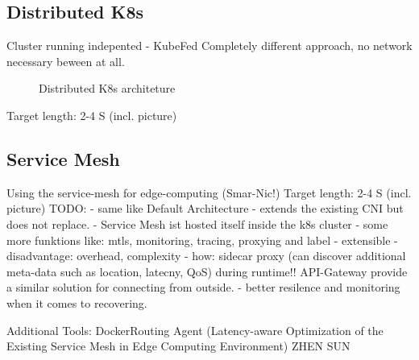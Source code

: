\documentclass[MSC,Master,english]{twbook}%
\begin{document}
\subsection{Distributed K8s}
Cluster running indepented - KubeFed
Completely different approach, no network necessary beween at all.
\begin{figure}[h]
    \centering
    \caption{Distributed \ac{K8s} architeture}
    \label{fig:default-k8s}
\end{figure}
Target length: 2-4 S (incl. picture)


\subsection{Service Mesh}
Using the service-mesh for edge-computing (Smar-Nic!)
Target length: 2-4 S (incl. picture)
TODO:
- same like Default Architecture
- extends the existing \ac{CNI} but does not replace.
- Service Mesh ist hosted itself inside the k8s cluster
- some more funktions like: mtls, monitoring, tracing, proxying and label
- extensible
- disadvantage: overhead, complexity
- how: sidecar proxy (can discover additional meta-data such as location, latecny, QoS) during runtime!! API-Gateway provide a similar solution for connecting from outside.
- better resilence and monitoring when it comes to recovering.

Additional Tools: DockerRouting Agent  (Latency-aware Optimization
of the Existing Service Mesh
in Edge Computing
Environment) ZHEN SUN
\end{document}
